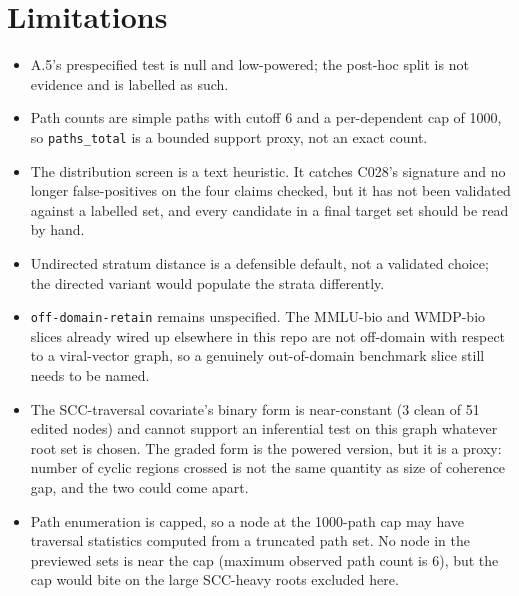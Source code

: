 \documentclass[11pt]{article}
\begin{document}
\section{Limitations}

\begin{itemize}[nosep]
  \item A.5's prespecified test is null and low-powered; the post-hoc split is
        not evidence and is labelled as such.
  \item Path counts are simple paths with cutoff 6 and a per-dependent cap of
        1000, so \texttt{paths\_total} is a bounded support proxy, not an exact
        count.
  \item The distribution screen is a text heuristic. It catches C028's
        signature and no longer false-positives on the four claims checked, but
        it has not been validated against a labelled set, and every candidate in
        a final target set should be read by hand.
  \item Undirected stratum distance is a defensible default, not a validated
        choice; the directed variant would populate the strata differently.
  \item \texttt{off-domain-retain} remains unspecified. The MMLU-bio and
        WMDP-bio slices already wired up elsewhere in this repo are not
        off-domain with respect to a viral-vector graph, so a genuinely
        out-of-domain benchmark slice still needs to be named.
  \item The SCC-traversal covariate's binary form is near-constant (3 clean of 51
        edited nodes) and cannot support an inferential test on this graph
        whatever root set is chosen. The graded form is the powered version, but
        it is a proxy: number of cyclic regions crossed is not the same quantity
        as size of coherence gap, and the two could come apart.
  \item Path enumeration is capped, so a node at the 1000-path cap may have
        traversal statistics computed from a truncated path set. No node in the
        previewed sets is near the cap (maximum observed path count is 6), but
        the cap would bite on the large SCC-heavy roots excluded here.
\end{itemize}
\end{document}

